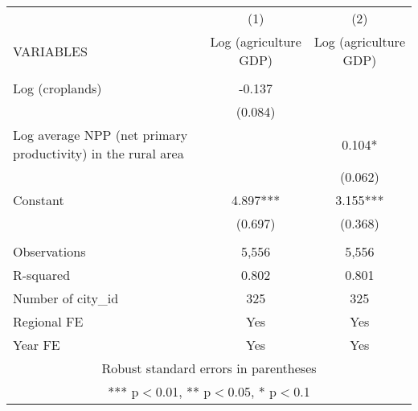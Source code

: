 \documentclass[]{article}
\begin{document}
\begin{tabular}{lcc} \hline
 & (1) & (2) \\
VARIABLES & Log (agriculture GDP) & Log (agriculture GDP) \\ \hline
 &  &  \\
Log (croplands) & -0.137 &  \\
 & (0.084) &  \\
Log average NPP (net primary productivity) in the rural area &  & 0.104* \\
 &  & (0.062) \\
Constant & 4.897*** & 3.155*** \\
 & (0.697) & (0.368) \\
 &  &  \\
Observations & 5,556 & 5,556 \\
R-squared & 0.802 & 0.801 \\
Number of city\_id & 325 & 325 \\
Regional FE & Yes & Yes \\
 Year FE & Yes & Yes \\ \hline
\multicolumn{3}{c}{ Robust standard errors in parentheses} \\
\multicolumn{3}{c}{ *** p$<$0.01, ** p$<$0.05, * p$<$0.1} \\
\end{tabular}
\end{document}
